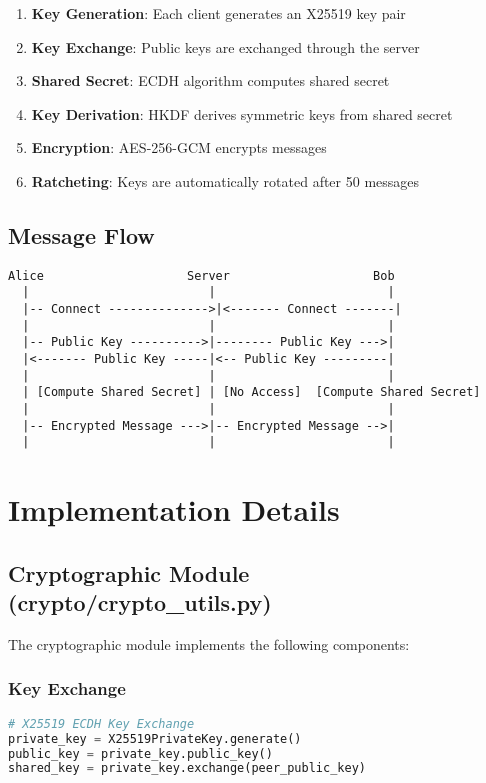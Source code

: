 \documentclass[12pt,a4paper]{article}
\begin{document}
\begin{enumerate}
    \item \textbf{Key Generation}: Each client generates an X25519 key pair
    \item \textbf{Key Exchange}: Public keys are exchanged through the server
    \item \textbf{Shared Secret}: ECDH algorithm computes shared secret
    \item \textbf{Key Derivation}: HKDF derives symmetric keys from shared secret
    \item \textbf{Encryption}: AES-256-GCM encrypts messages
    \item \textbf{Ratcheting}: Keys are automatically rotated after 50 messages
\end{enumerate}

\subsection{Message Flow}

\begin{verbatim}
Alice                    Server                    Bob
  |                         |                        |
  |-- Connect -------------->|<------- Connect -------|
  |                         |                        |
  |-- Public Key ---------->|-------- Public Key --->|
  |<------- Public Key -----|<-- Public Key ---------|
  |                         |                        |
  | [Compute Shared Secret] | [No Access]  [Compute Shared Secret]
  |                         |                        |
  |-- Encrypted Message --->|-- Encrypted Message -->|
  |                         |                        |
\end{verbatim}

\section{Implementation Details}

\subsection{Cryptographic Module (crypto/crypto\_utils.py)}

The cryptographic module implements the following components:

\subsubsection{Key Exchange}
\begin{lstlisting}[language=Python]
# X25519 ECDH Key Exchange
private_key = X25519PrivateKey.generate()
public_key = private_key.public_key()
shared_key = private_key.exchange(peer_public_key)
\end{lstlisting}
\end{document}
